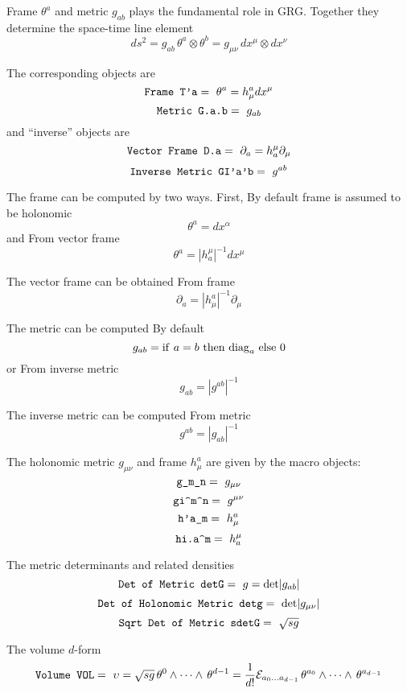 \documentclass[twoside,openright]{report}
\newcommand{\grgtt}{\ttfamily}
\newcommand{\object}[2]{%
\begin{equation}
\mbox{\comm{#1}} =\ #2
\end{equation}}
\renewcommand{\tt}{\grgtt}
\def\^{{\tt \char'136}}                     %
\def\_{{\tt \char'137}}                     %
\newcommand{\grg}{{\sc GRG}}
\newcommand{\comm}[1]{{\upshape\tt#1}}    %
\begin{document}
Frame $\theta^a$ and metric $g_{ab}$ plays the
fundamental role in \grg. Together they determine the
space-time line element
\begin{equation}
ds^2 = g_{ab}\,\theta^a\!\otimes\theta^b =
 g_{\mu\nu}\,dx^\mu\!\otimes dx^\nu
\end{equation}

The corresponding objects are
\object{Frame  T'a}{\theta^a=h^a_\mu dx^\mu}
\object{Metric  G.a.b}{g_{ab}}
and ``inverse'' objects are
\object{Vector  Frame D.a}{\partial_a=h^\mu_a\partial_\mu}
\object{Inverse Metric  GI'a'b}{g^{ab}}

The frame can be computed by two ways. First, {\tt By default}
frame is assumed to be holonomic
\begin{equation}
\theta^a = dx^\alpha
\end{equation}
and {\tt From vector frame}
\begin{equation}
\theta^a= |h_a^\mu|^{-1} d x^\mu
\end{equation}

The vector frame can be obtained {\tt From frame}
\begin{equation}
\partial_a= |h^a_\mu|^{-1} \partial_\mu
\end{equation}

The metric can be computed {\tt By default} 
\begin{equation}
g_{ab} = {\rm if}\ a=b\ {\rm then}\ {\rm diag}_a\ {\rm else}\ 0
\end{equation}
or {\tt From inverse metric}
\begin{equation}
g_{ab} = |g^{ab}|^{-1}
\end{equation}

The inverse metric can be computed {\tt From metric}
\begin{equation}
g^{ab} = |g_{ab}|^{-1}
\end{equation}

The holonomic metric $g_{\mu\nu}$ and frame $h^a_\mu$
are given by the macro objects:
\object{g\_m\_n}{g_{\mu\nu}}
\object{gi\^m\^n}{g^{\mu\nu}}
\object{h'a\_m}{h^a_\mu}
\object{hi.a\^m}{h_a^\mu}

The metric determinants and related densities
\object{Det of Metric  detG}{g={\rm det}|g_{ab}|}
\object{Det of Holonomic Metric  detg}{{\rm det}|g_{\mu\nu}|}
\object{Sqrt Det of Metric sdetG}{\sqrt{sg}}

The volume $d$-form
\object{Volume  VOL}{\upsilon = \sqrt{sg}\,\theta^0\wedge\dots\wedge\,\theta^{d-1}
=\frac{1}{d!}{\cal E}_{a_0\dots a_{d-1}}\,\theta^{a_0}\wedge\dots\wedge\,\theta^{a_{d-1}}}
\end{document}
